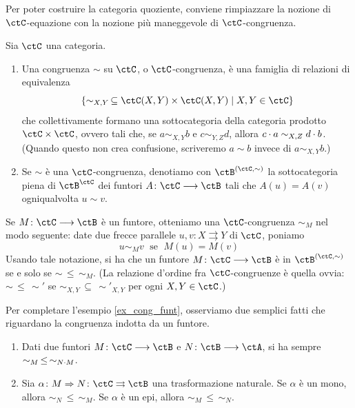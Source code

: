 Per poter costruire la categoria quoziente, conviene rimpiazzare la nozione di \(\ctC\)-equazione con la nozione più
maneggevole di \(\ctC\)-congruenza.

\begin{definition}\label{def_cong_cat}
 Sia \(\ctC\) una categoria.
 \begin{enumerate}
  \item Una congruenza \(\sim\) su \(\ctC\), o \(\ctC\)-congruenza, è una famiglia di relazioni di equivalenza
        \[\{\sim_{X,Y} \, \subseteq \ctC(X,Y) \times \ctC(X,Y) \mid X,Y \in \ctC\}\]
        che collettivamente formano una sottocategoria della categoria prodotto \(\ctC \times \ctC\), ovvero
        tali che, se \(a \sim_{X,Y}b\) e \(c \sim_{Y,Z}d\), allora \(c \cdot a \sim_{X,Z} d \cdot b\).  \\
        (Quando questo non crea confusione, scriveremo \(a \sim b\) invece di \(a \sim_{X,Y} b\).)
  \item Se \(\sim\) è una \(\ctC\)-congruenza, denotiamo con \(\ctB^{(\ctC,\sim)}\) la sottocategoria piena di \(\ctB^{\ctC}\)
        dei funtori \(A \colon \ctC \fun \ctB\) tali che \(A(u)=A(v)\) ogniqualvolta \(u \sim v\).
 \end{enumerate}
\end{definition}

\begin{example}\label{ex_cong_funt}
 Se \(M \colon \ctC \fun \ctB\) è un funtore, otteniamo una \(\ctC\)-congruenza \(\sim_M\) nel modo seguente:
 date due frecce parallele
 \(u,v \colon X \rightrightarrows Y\) di \(\ctC\), poniamo
 \[u \sim_M v \;\mbox{ se }\; M(u)=M(v)\]
 Usando tale notazione, si ha che un funtore \(M \colon \ctC \fun \ctB\) è in \(\ctB^{(\ctC,\sim)}\) se e solo se \(\sim \,\leq\, \sim_M\).
 (La relazione d'ordine fra \(\ctC\)-congruenze è quella ovvia: \(\sim \, \leq \, \sim'\) se \(\sim_{X,Y} \, \subseteq \, \sim'_{X,Y}\)
 per ogni \(X,Y \in \ctC\).)
\end{example}

\begin{remark}\label{oss_cong_funt}
 Per completare l'esempio \ref{ex_cong_funt}, osserviamo due semplici fatti che riguardano la congruenza indotta da un funtore.
 \begin{enumerate}
  \item Dati due funtori \(M \colon \ctC \fun \ctB\) e \(N \colon \ctB \fun \ctA\), si ha
        sempre \(\sim_M \,\leq\, \sim_{N \cdot M}\).
  \item Sia \(\alpha \colon M \nat N \colon \ctC \rightrightarrows \ctB\) una trasformazione naturale. Se \(\alpha\) è un mono, allora
        \(\sim_N \,\leq\, \sim_M\). Se \(\alpha\) è un epi, allora \(\sim_M \,\leq\, \sim_N\).
 \end{enumerate}
\end{remark}

